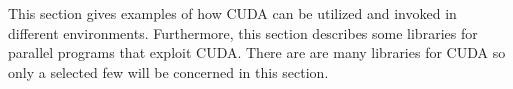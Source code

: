 This section gives examples of how CUDA can be utilized and invoked in different environments.
Furthermore, this section describes some libraries for parallel programs that exploit CUDA.
There are are many libraries for CUDA so only a selected few will be concerned in this section.
